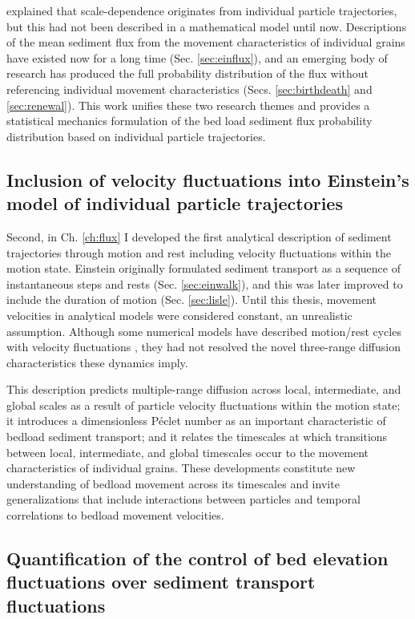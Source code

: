 \citet{Ballio2018} explained that scale-dependence originates from individual particle trajectories, but this had not been described in a mathematical model until now.
Descriptions of the mean sediment flux from the movement characteristics of individual grains have existed now for a long time (Sec. \ref{sec:einflux}), and an emerging body of research has produced the full probability distribution of the flux without referencing individual movement characteristics (Secs. \ref{sec:birthdeath} and \ref{sec:renewal}). 
This work unifies these two research themes and provides a statistical mechanics formulation of the bed load sediment flux probability distribution based on individual particle trajectories.

\subsection{Inclusion of velocity fluctuations into Einstein's model of individual particle trajectories}

Second, in Ch. \ref{ch:flux} I developed the first analytical description of sediment trajectories through motion and rest including velocity fluctuations within the motion state.
Einstein originally formulated sediment transport as a sequence of instantaneous steps and rests (Sec. \ref{sec:einwalk}), and this was later improved to include the duration of motion (Sec. \ref{sec:lisle}).
Until this thesis, movement velocities in analytical models were considered constant, an unrealistic assumption.
Although some numerical models have described motion/rest cycles with velocity fluctuations \citep{Fan2016,Bialik2012,Schmeeckle2014}, they had not resolved the novel three-range diffusion characteristics these dynamics imply.

This description predicts multiple-range diffusion across local, intermediate, and global scales as a result of particle velocity fluctuations within the motion state; it introduces a dimensionless P\'{e}clet number as an important characteristic of bedload sediment transport; and it relates the timescales at which transitions between local, intermediate, and global timescales occur to the movement characteristics of individual grains.
These developments constitute new understanding of bedload movement across its timescales and invite generalizations that include interactions between particles and temporal correlations to bedload movement velocities.

\subsection{Quantification of the control of bed elevation fluctuations over sediment transport fluctuations}

